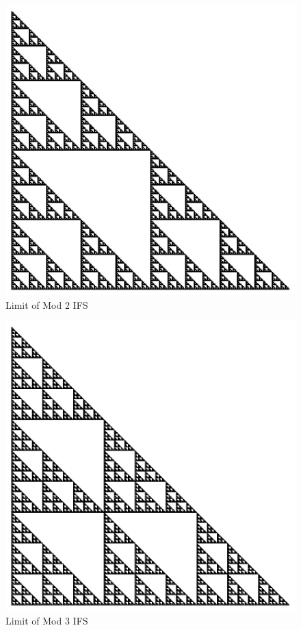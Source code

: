 \documentclass{beamer}
\begin{document}
\begin{frame}
    \begin{figure}
        \centering
        \includegraphics[scale=0.5]{GlobalMod2.pdf}
        \caption{Limit of Mod 2 IFS}
    \end{figure}
\end{frame}

\begin{frame}
    \begin{figure}
        \centering
        \includegraphics[scale=0.5]{GlobalMod3.pdf}
        \caption{Limit of Mod 3 IFS}
    \end{figure}
\end{frame}
\end{document}

